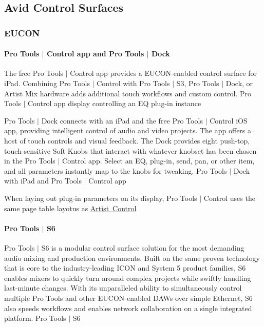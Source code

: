  \hypertarget{a00833_aax_page_table_guide_02_avid_control_surfaces}{}\subsection{Avid Control Surfaces}\label{a00833_aax_page_table_guide_02_avid_control_surfaces}
\hypertarget{a00833_subsection__eucon}{}\subsubsection{E\+U\+C\+ON}\label{a00833_subsection__eucon}
\hypertarget{a00833_subsubsection__avid_ptcontrol}{}\paragraph{Pro Tools $\vert$ Control app and Pro Tools $\vert$ Dock}\label{a00833_subsubsection__avid_ptcontrol}
The free Pro Tools $\vert$ Control app provides a E\+U\+C\+O\+N-\/enabled control surface for i\+Pad. Combining Pro Tools $\vert$ Control with Pro Tools $\vert$ S3, Pro Tools $\vert$ Dock, or Artist Mix hardware adds additional touch workflows and custom control.   Pro Tools $\vert$ Control app display controlling an EQ plug-\/in instance 

Pro Tools $\vert$ Dock connects with an i\+Pad and the free Pro Tools $\vert$ Control i\+OS app, providing intelligent control of audio and video projects. The app offers a host of touch controls and visual feedback. The Dock provides eight push-\/top, touch-\/sensitive Soft Knobs that interact with whatever knobset has been chosen in the Pro Tools $\vert$ Control app. Select an EQ, plug-\/in, send, pan, or other item, and all parameters instantly map to the knobs for tweaking.   Pro Tools $\vert$ Dock with i\+Pad and Pro Tools $\vert$ Control app 

When laying out plug-\/in parameters on its display, Pro Tools $\vert$ Control uses the same page table layotus as \mbox{\hyperlink{a00833_subsubsection__avid_artist_series_mc_control_v2_}{Artist Control}}

\hypertarget{a00833_subsubsection__avid_s6}{}\paragraph{Pro Tools $\vert$ S6}\label{a00833_subsubsection__avid_s6}
Pro Tools $\vert$ S6 is a modular control surface solution for the most demanding audio mixing and production environments. Built on the same proven technology that is core to the industry-\/leading I\+C\+ON and System 5 product families, S6 enables mixers to quickly turn around complex projects while swiftly handling last-\/minute changes. With its unparalleled ability to simultaneously control multiple Pro Tools and other E\+U\+C\+O\+N-\/enabled D\+A\+Ws over simple Ethernet, S6 also speeds workflows and enables network collaboration on a single integrated platform.   Pro Tools $\vert$ S6 

